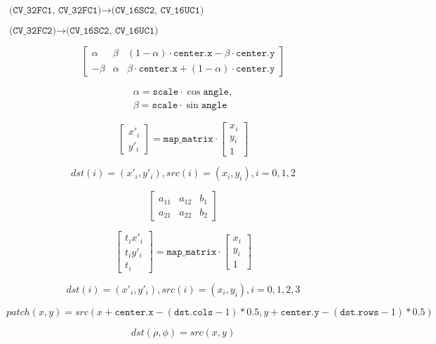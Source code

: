 \documentclass{article}
\begin{document}
$\texttt{(CV_32FC1, CV_32FC1)} \rightarrow \texttt{(CV_16SC2, CV_16UC1)}$
\pagebreak

$\texttt{(CV_32FC2)} \rightarrow \texttt{(CV_16SC2, CV_16UC1)}$
\pagebreak

\[\begin{bmatrix} \alpha & \beta & (1- \alpha ) \cdot \texttt{center.x} - \beta \cdot \texttt{center.y} \\ - \beta & \alpha & \beta \cdot \texttt{center.x} + (1- \alpha ) \cdot \texttt{center.y} \end{bmatrix}\]
\pagebreak

\[\begin{array}{l} \alpha = \texttt{scale} \cdot \cos \texttt{angle} , \\ \beta = \texttt{scale} \cdot \sin \texttt{angle} \end{array}\]
\pagebreak

\[\begin{bmatrix} x'_i \\ y'_i \end{bmatrix} = \texttt{map_matrix} \cdot \begin{bmatrix} x_i \\ y_i \\ 1 \end{bmatrix}\]
\pagebreak

\[dst(i)=(x'_i,y'_i), src(i)=(x_i, y_i), i=0,1,2\]
\pagebreak

\[\begin{bmatrix} a_{11} & a_{12} & b_1 \\ a_{21} & a_{22} & b_2 \end{bmatrix}\]
\pagebreak

\[\begin{bmatrix} t_i x'_i \\ t_i y'_i \\ t_i \end{bmatrix} = \texttt{map_matrix} \cdot \begin{bmatrix} x_i \\ y_i \\ 1 \end{bmatrix}\]
\pagebreak

\[dst(i)=(x'_i,y'_i), src(i)=(x_i, y_i), i=0,1,2,3\]
\pagebreak

\[patch(x, y) = src(x + \texttt{center.x} - ( \texttt{dst.cols} -1)*0.5, y + \texttt{center.y} - ( \texttt{dst.rows} -1)*0.5)\]
\pagebreak

\[ dst(\rho , \phi ) = src(x,y) \]
\pagebreak
\end{document}

